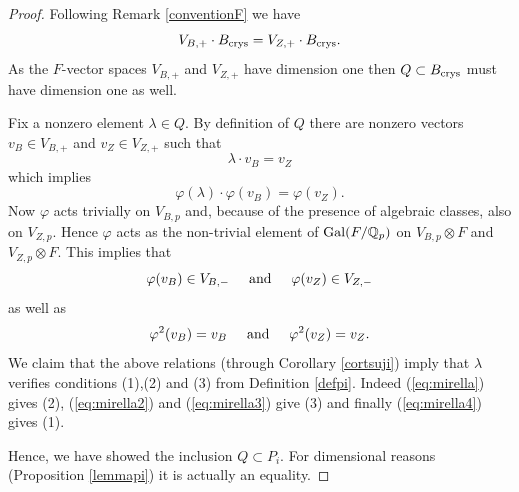 \documentclass[11pt]{amsart}
\begin{document}
\begin{proof}
 Following Remark \ref{conventionF} we have 
 \begin{equation} \label{eq:mirella0}V_{B,+} \cdot B_{\textnormal{crys}} =  V_{Z,+} \cdot B_{\textnormal{crys}}.\end{equation}
  As the  $F$-vector spaces $V_{B,+} $ and $ V_{Z,+}$ have dimension one   then $Q\subset B_{\textnormal{crys}}$ must have dimension one as well.
 
Fix a nonzero element $\lambda \in Q$. By definition of $Q$ there are nonzero vectors $v_B \in V_{B,+} $ and $v_Z \in V_{Z,+} $ such that
\begin{equation} \label{eq:mirella} \lambda \cdot v_{B} = v_{Z}  \end{equation}
which implies 
\begin{equation} \label{eq:mirella2} \varphi(\lambda) \cdot \varphi(v_{B}) = \varphi(v_{Z}).
\end{equation}
Now  $\varphi$ acts trivially on $V_{B,p}$ and,  because of the presence of algebraic classes, also on $V_{Z,p}$. Hence $\varphi$ acts as the non-trivial element of $\textnormal{Gal}(F/\mathbb{Q}_p)$ on $V_{B,p}\otimes F$ and  $V_{Z,p}\otimes F$. This implies that 
\begin{equation} \label{eq:mirella3} \varphi(v_{B})  \in V_{B,-} \hspace{0.5cm}  \textrm{and} \hspace{0.5cm} \varphi(v_{Z})  \in V_{Z,-} 
\end{equation}
as well as 
\begin{equation} \label{eq:mirella4} \varphi^2(v_B)=v_B \hspace{0.5cm}  \textrm{and} \hspace{0.5cm}   \varphi^2(v_Z)=v_Z.
\end{equation}
We claim that  the above relations (through Corollary \ref{cortsuji}) imply   that $\lambda$ verifies conditions (1),(2) and (3) from Definition \ref{defpi}. Indeed (\ref{eq:mirella}) gives (2), (\ref{eq:mirella2}) and  (\ref{eq:mirella3}) give (3) and finally  (\ref{eq:mirella4}) gives (1).

Hence, we have showed the  inclusion $Q \subset P_i$. For dimensional reasons (Proposition \ref{lemmapi}) it is actually an equality.
\end{proof}
\end{document}
